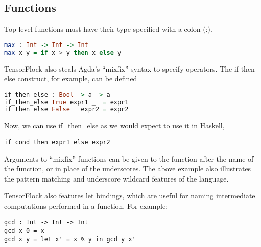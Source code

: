 \documentclass[12pt]{article}
\begin{document}
\subsection{Functions}
Top level functions must have their type specified with a colon (:).
\begin{lstlisting}[language=Haskell]
max : Int -> Int -> Int
max x y = if x > y then x else y
\end{lstlisting}
TensorFlock also steals Agda's ``mixfix'' syntax to specify operators. The if-then-else construct, for example, can be defined
\begin{lstlisting}[language=Haskell]
if_then_else : Bool -> a -> a
if_then_else True expr1 _  = expr1
if_then_else False _ expr2 = expr2
\end{lstlisting}
Now, we can use if\_then\_else as we would expect to use it in Haskell, 
\begin{lstlisting}
if cond then expr1 else expr2
\end{lstlisting}
Arguments to ``mixfix'' functions can be given to the function after the name of the function, or in place of the underscores. The above example also illustrates the pattern matching and underscore wildcard features of the language. 

TensorFlock also features let bindings, which are useful for naming intermediate computations performed in a function. For example:
\begin{lstlisting}
gcd : Int -> Int -> Int
gcd x 0 = x
gcd x y = let x' = x % y in gcd y x'
\end{lstlisting}
\end{document}

